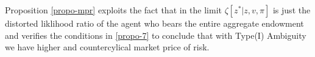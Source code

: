 \documentclass[12pt]{article}
\newtheorem{proposition}{Proposition}
\begin{document}
Proposition \ref{propo-mpr} exploits the fact that in the limit $\zeta[z^*|z,v,\pi]$ is just the distorted liklihood ratio of the agent who bears the entire aggregate endowment and verifies the conditions in \ref{propo-7} to conclude that with Type(I) Ambiguity we have higher and countercylical market price of risk.   




%
%
%
\end{document}
